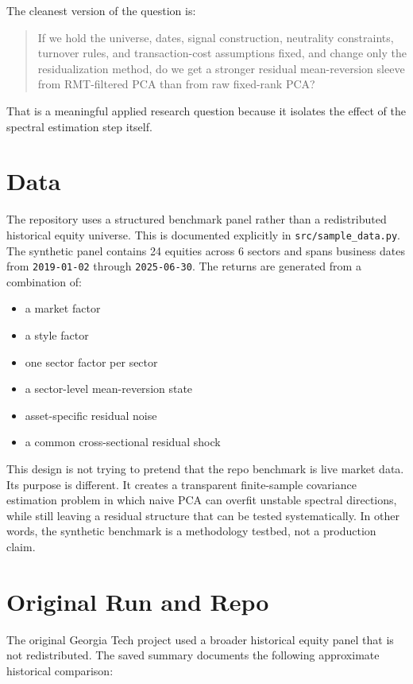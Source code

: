 \documentclass[11pt]{article}
\begin{document}
The cleanest version of the question is:

\begin{quote}
If we hold the universe, dates, signal construction, neutrality constraints,
turnover rules, and transaction-cost assumptions fixed, and change only the
residualization method, do we get a stronger residual mean-reversion sleeve from
RMT-filtered PCA than from raw fixed-rank PCA?
\end{quote}

That is a meaningful applied research question because it isolates the effect of
the spectral estimation step itself.

\section*{Data}

The repository uses a structured benchmark panel rather than a
redistributed historical equity universe. This is documented explicitly in
\texttt{src/sample\_data.py}. The synthetic panel contains 24 equities across 6
sectors and spans business dates from \texttt{2019-01-02} through
\texttt{2025-06-30}. The returns are generated from a combination of:

\begin{itemize}
  \item a market factor
  \item a style factor
  \item one sector factor per sector
  \item a sector-level mean-reversion state
  \item asset-specific residual noise
  \item a common cross-sectional residual shock
\end{itemize}

This design is not trying to pretend that the repo benchmark is live market data.
Its purpose is different. It creates a transparent finite-sample covariance
estimation problem in which naive PCA can overfit unstable spectral directions,
while still leaving a residual structure that can be tested systematically. In
other words, the synthetic benchmark is a methodology testbed, not a production
claim.

\section*{Original Run and Repo}

The original Georgia Tech project used a broader historical equity panel that is
not redistributed. The saved summary documents the following approximate
historical comparison:
\end{document}
